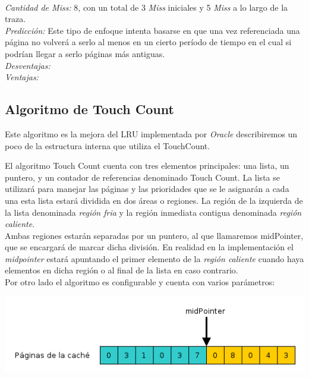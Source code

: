 \documentclass[11pt, a4paper, spanish]{article}
\begin{document}
\\
\emph{Cantidad de Miss:} 8, con un total de 3 \textit{Miss} iniciales y 5 \textit{Miss} a lo largo de la traza. \\
\emph{Predicci\'on:} Este tipo de enfoque intenta basarse en que una vez referenciada una p\'agina no volver\'a a serlo al menos en un cierto per\'iodo
de tiempo en el cual si podr\'ian llegar a serlo p\'aginas m\'as antiguas.\\
\emph{Desventajas:} \\
\emph{Ventajas:} \\

\newpage
\subsection{Algoritmo de Touch Count}

Este algoritmo es la mejora del LRU implementada por \textit{Oracle} describiremos un poco de la estructura interna que utiliza el TouchCount.

El algoritmo Touch Count cuenta con tres elementos principales: una lista, un puntero, y un contador de referencias denominado Touch Count. 
La lista se utilizar\'a para manejar las p\'aginas y las prioridades que se le asignar\'an a cada
una esta lista estar\'a dividida en dos \'areas o regiones. La regi\'on de la izquierda de la lista denominada \textit{regi\'on fria} y la regi\'on inmediata
contigua denominada \textit{regi\'on caliente}.\\

Ambas regiones estar\'an separadas por un puntero, al que llamaremos midPointer, que se encargar\'a de marcar dicha divisi\'on. 
En realidad en la implementaci\'on el \textit{midpointer} estar\'a apuntando el primer elemento de la \textit{regi\'on caliente} cuando haya
elementos en dicha regi\'on o al final de la lista en caso contrario.\\

Por otro lado el algoritmo es configurable y cuenta con varios par\'ametros:

\begin{center}
	\includegraphics[scale=0.65]{diagramas/TouchCountAlgorithm1.png}\\
\end{center}
\end{document}

